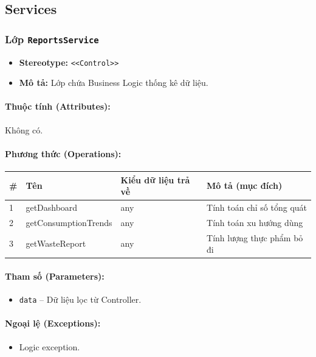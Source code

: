 \documentclass[12pt,a4paper]{article}
\begin{document}
\subsection{Services}

\subsubsection{Lớp \texttt{ReportsService}}
\begin{itemize}[leftmargin=*]
    \item \textbf{Stereotype:} \texttt{\textless{}\textless{}Control\textgreater{}\textgreater{}}
    \item \textbf{Mô tả:} Lớp chứa Business Logic thống kê dữ liệu.
\end{itemize}

\paragraph{Thuộc tính (Attributes):}
Không có.

\paragraph{Phương thức (Operations):}
\begin{longtable}{|p{0.6cm}|p{3.8cm}|p{2.6cm}|p{6.5cm}|}
\hline
\textbf{\#} & \textbf{Tên} & \textbf{Kiểu dữ liệu trả về} & \textbf{Mô tả (mục đích)} \\ \hline
\endhead
1 & getDashboard & any & Tính toán chỉ số tổng quát \\ \hline
2 & getConsumptionTrends & any & Tính toán xu hướng dùng \\ \hline
3 & getWasteReport & any & Tính lượng thực phẩm bỏ đi \\ \hline
\end{longtable}

\paragraph{Tham số (Parameters):}
\begin{itemize}[leftmargin=*]
    \item \texttt{data} – Dữ liệu lọc từ Controller.
\end{itemize}


\paragraph{Ngoại lệ (Exceptions):}
\begin{itemize}[leftmargin=*]
    \item Logic exception.
\end{itemize}
\end{document}
